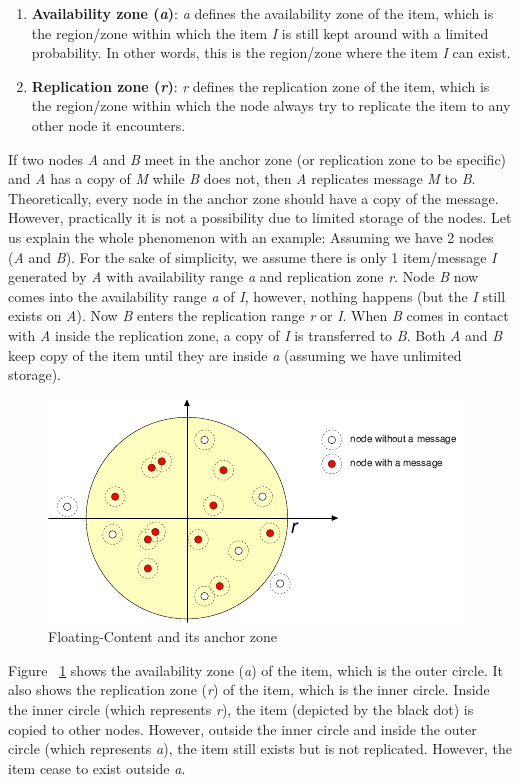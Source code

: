 \begin{enumerate}
  \item \textbf{Availability zone (\textit{a})}: \textit{a} defines the availability zone of the item, which is the region/zone within which the item \textit{I} is still kept around with a limited probability. In other words, this is the region/zone where the item \textit{I} can exist.
  \item \textbf{Replication zone (\textit{r})}: \textit{r} defines the replication zone of the item, which is the region/zone within which the node always try to replicate the item to any other node it encounters.
\end{enumerate}
\vspace{3mm}
If two nodes \textit{A} and \textit{B} meet in the anchor zone (or replication zone to be specific) and \textit{A} has a copy of \textit{M} while \textit{B} does not, then \textit{A} replicates message \textit{M} to \textit{B}. Theoretically, every node in the anchor zone should have a copy of the message. However, practically it is not a possibility due to limited storage of the nodes.
\vspace{3mm}
Let us explain the whole phenomenon with an example:
Assuming we have 2 nodes (\textit{A} and \textit{B}). For the sake of simplicity, we assume there is only 1 item/message \textit{I} generated by \textit{A} with availability range \textit{a} and replication zone \textit{r}. Node \textit{B} now comes into the availability range \textit{a} of \textit{I}, however, nothing happens (but the \textit{I} still exists on \textit{A}). Now \textit{B} enters the replication range \textit{r} or \textit{I}. When \textit{B} comes in contact with \textit{A} inside the replication zone, a copy of \textit{I} is transferred to \textit{B}. Both \textit{A} and \textit{B} keep copy of the item until they are inside \textit{a} (assuming we have unlimited storage).

\begin{figure}[h]
\centering
\includegraphics{./figures/anchor-zone}
\caption{Floating-Content and its anchor zone \cite{floating-content}}
\label{fig:floating-content}
\end{figure}
Figure ~\ref{fig:floating-content} shows the availability zone (\textit{a}) of the item, which is the outer circle. It also shows the replication zone (\textit{r}) of the item, which is the inner circle. Inside the inner circle (which represents \textit{r}), the item (depicted by the black dot) is copied to other nodes. However, outside the inner circle and inside the outer circle (which represents \textit{a}), the item still exists but is not replicated. However, the item cease to exist outside \textit{a}.

